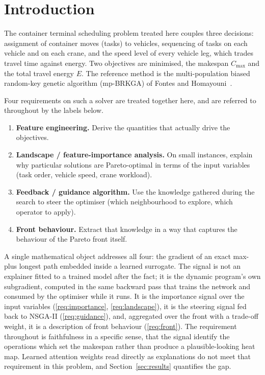 \documentclass[11pt]{article}
\newcommand{\Cmax}{C_{\max}}
\begin{document}
\section{Introduction}
\label{sec:intro}

The container terminal scheduling problem treated here couples three decisions:
assignment of container moves (tasks) to vehicles, sequencing of tasks on each vehicle
and on each crane, and the speed level of every vehicle leg, which trades travel time
against energy. Two objectives are minimised, the makespan $\Cmax$ and the total travel
energy $E$. The reference method is the multi-population biased random-key genetic
algorithm (mp-BRKGA) of Fontes and Homayouni~\cite{fontes2022mpbrkga}.

Four requirements on such a solver are treated together here, and are referred to
throughout by the labels below.

\begin{enumerate}[leftmargin=*,label=\textbf{R\arabic*.},ref=R\arabic*,nosep]
  \item\label{req:importance} \textbf{Feature engineering.} Derive the quantities that
    actually drive the objectives.
  \item\label{req:landscape} \textbf{Landscape / feature-importance analysis.} On small
    instances, explain why particular solutions are Pareto-optimal in terms of the input
    variables (task order, vehicle speed, crane workload).
  \item\label{req:guidance} \textbf{Feedback / guidance algorithm.} Use the knowledge
    gathered during the search to steer the optimiser (which neighbourhood to explore,
    which operator to apply).
  \item\label{req:front} \textbf{Front behaviour.} Extract that knowledge in a way that
    captures the behaviour of the Pareto front itself.
\end{enumerate}

A single mathematical object addresses all four: the gradient of an exact max-plus
longest path embedded inside a learned surrogate. The signal is not an explainer fitted to
a trained model after the fact; it is the dynamic program's own subgradient, computed in
the same backward pass that trains the network and consumed by the optimiser while it runs.
It is the importance signal over the input variables (\ref{req:importance},
\ref{req:landscape}), it is the steering signal fed back to NSGA-II (\ref{req:guidance}),
and, aggregated over the front with a trade-off weight, it is a description of front
behaviour (\ref{req:front}).
The requirement throughout is faithfulness in a specific sense, that the signal identify
the operations which set the makespan rather than produce a plausible-looking heat map.
Learned attention weights read directly as explanations do not meet that requirement in
this problem, and Section~\ref{sec:results} quantifies the gap.
\end{document}
